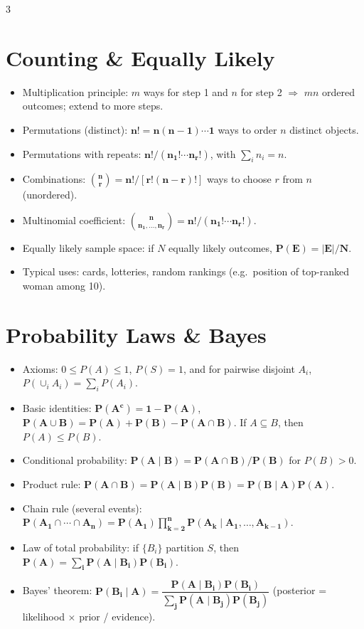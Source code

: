 \documentclass[11pt,landscape]{article}
\begin{document}
\begin{multicols}{3}
\section{Counting \& Equally Likely}
\begin{itemize}
  \item Multiplication principle: $m$ ways for step 1 and $n$ for step 2 $\Rightarrow$ $mn$ ordered outcomes; extend to more steps.
  \item Permutations (distinct): $\mathbf{n!=n(n-1)\cdots1}$ ways to order $n$ distinct objects.
  \item Permutations with repeats: $\mathbf{n!/(n_1!\cdots n_r!)}$, with $\sum_i n_i=n$.
  \item Combinations: $\mathbf{\binom{n}{r}=n!/[r!(n-r)!]}$ ways to choose $r$ from $n$ (unordered).
  \item Multinomial coefficient: $\mathbf{\binom{n}{n_1,\dots,n_r}=n!/(n_1!\cdots n_r!)}$.
  \item Equally likely sample space: if $N$ equally likely outcomes, $\mathbf{P(E)=|E|/N}$.
  \item Typical uses: cards, lotteries, random rankings (e.g.\ position of top-ranked woman among 10).
\end{itemize}

\section{Probability Laws \& Bayes}
\begin{itemize}
  \item Axioms: $0\le P(A)\le1$, $P(S)=1$, and for pairwise disjoint $A_i$, $P(\cup_i A_i)=\sum_i P(A_i)$.
  \item Basic identities: $\mathbf{P(A^c)=1-P(A)}$, $\mathbf{P(A\cup B)=P(A)+P(B)-P(A\cap B)}$. If $A\subseteq B$, then $P(A)\le P(B)$.
  \item Conditional probability: $\mathbf{P(A\mid B)=P(A\cap B)/P(B)}$ for $P(B)>0$.
  \item Product rule: $\mathbf{P(A\cap B)=P(A\mid B)P(B)=P(B\mid A)P(A)}$.
  \item Chain rule (several events): $\mathbf{P(A_1\cap\cdots\cap A_n)=P(A_1)\prod_{k=2}^n P(A_k\mid A_1,\dots,A_{k-1})}$.
  \item Law of total probability: if $\{B_i\}$ partition $S$, then $\mathbf{P(A)=\sum_i P(A\mid B_i)P(B_i)}$.
  \item Bayes' theorem: $\mathbf{P(B_i\mid A)=\dfrac{P(A\mid B_i)P(B_i)}{\sum_j P(A\mid B_j)P(B_j)}}$ (posterior = likelihood $\times$ prior / evidence).
\end{itemize}


\end{multicols}
\end{document}
